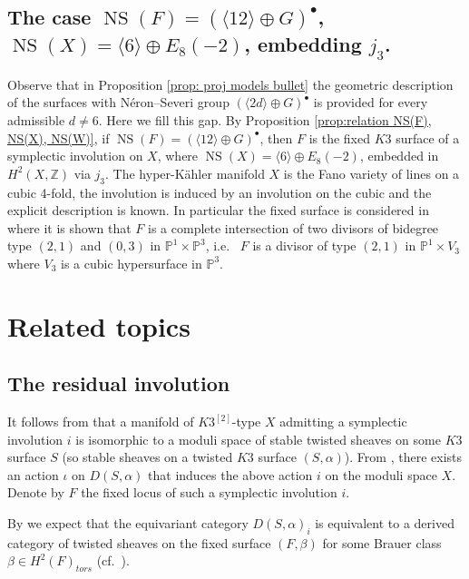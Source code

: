 \documentclass{amsart}
\theoremstyle{definition}
\numberwithin{equation}{section}
\numberwithin{equation}{section} \theoremstyle{definition}
\DeclareMathOperator{\NS}{NS}
\newcommand\Z{\mathbb{Z}}
\begin{document}
\subsection{The case $\NS(F)=(\langle 12\rangle\oplus G)^\bullet$, $\NS(X)=\langle 6\rangle\oplus E_8(-2)$, embedding $j_3$.} Observe that in Proposition \ref{prop: proj models bullet} the geometric description of the surfaces with N\'eron--Severi group $(\langle 2d\rangle\oplus G)^\bullet$ is provided for every admissible $d\neq 6$. Here we fill this gap.
By Proposition \ref{prop:relation NS(F), NS(X), NS(W)}, if $\NS(F)=(\langle 12\rangle\oplus G)^\bullet$, then $F$ is the fixed $K3$ surface of a symplectic involution on $X$, where $\NS(X)=\langle 6\rangle\oplus E_8(-2)$, embedded in $H^2(X,\Z)$ via $j_3$.  The hyper-K\"ahler manifold $X$ is the  Fano variety of lines on a cubic 4-fold, the involution is induced by an involution on the cubic and the explicit description is known. In particular the fixed surface is considered in \cite[Proposition 3.15]{CGKK} where it is shown that $F$ is a complete intersection of two divisors of bidegree type $(2,1)$ and $(0,3)$ in $\mathbb{P}^1\times \mathbb{P}^3$, i.e.~ $F$ is a divisor of type $(2,1)$ in $\mathbb{P}^1\times V_3$ where $V_3$ is a cubic hypersurface in $\mathbb{P}^3$. 

\section{Related topics}\label{section: related problems}

\subsection{The residual involution}\label{subset:the residuals involution}
It follows from \cite[Section 2]{CGKK} that a manifold of $K3^{[2]}$-type $X$ admitting a symplectic involution $i$ is isomorphic to a moduli space of stable twisted sheaves on some $K3$ surface $S$ (so stable sheaves on a twisted $K3$ surface $(S,\alpha)$).
From \cite[Proposition 1.4]{BO}, there exists an action $\iota$ on $D(S,\alpha)$ that induces the above action $i$ on the moduli space $X. $ 
Denote by $F$ the fixed locus of such a symplectic involution $i$.
 
By \cite[Theorem 1.1]{BO}  we expect that the equivariant category $D(S,\alpha)_{i}$ is equivalent to a derived category of twisted sheaves on the fixed surface $(F,\beta)$ for some Brauer class $\beta\in H^2(F)_{tors}$ (cf.~\cite[Section 1.3]{BO}). 
\end{document}
